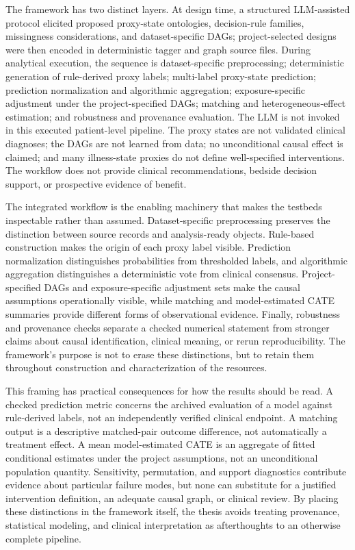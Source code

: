 The framework has two distinct layers.  At design time, a structured LLM-assisted protocol elicited proposed proxy-state ontologies, decision-rule families, missingness considerations, and dataset-specific DAGs; project-selected designs were then encoded in deterministic tagger and graph source files.  During analytical execution, the sequence is dataset-specific preprocessing; deterministic generation of rule-derived proxy labels; multi-label proxy-state prediction; prediction normalization and algorithmic aggregation; exposure-specific adjustment under the project-specified DAGs; matching and heterogeneous-effect estimation; and robustness and provenance evaluation.  The LLM is not invoked in this executed patient-level pipeline.  The proxy states are not validated clinical diagnoses; the DAGs are not learned from data; no unconditional causal effect is claimed; and many illness-state proxies do not define well-specified interventions.  The workflow does not provide clinical recommendations, bedside decision support, or prospective evidence of benefit.

The integrated workflow is the enabling machinery that makes the testbeds inspectable rather than assumed.  Dataset-specific preprocessing preserves the distinction between source records and analysis-ready objects.  Rule-based construction makes the origin of each proxy label visible.  Prediction normalization distinguishes probabilities from thresholded labels, and algorithmic aggregation distinguishes a deterministic vote from clinical consensus.  Project-specified DAGs and exposure-specific adjustment sets make the causal assumptions operationally visible, while matching and model-estimated CATE summaries provide different forms of observational evidence.  Finally, robustness and provenance checks separate a checked numerical statement from stronger claims about causal identification, clinical meaning, or rerun reproducibility.  The framework's purpose is not to erase these distinctions, but to retain them throughout construction and characterization of the resources.

This framing has practical consequences for how the results should be read.  A checked prediction metric concerns the archived evaluation of a model against rule-derived labels, not an independently verified clinical endpoint.  A matching output is a descriptive matched-pair outcome difference, not automatically a treatment effect.  A mean model-estimated CATE is an aggregate of fitted conditional estimates under the project assumptions, not an unconditional population quantity.  Sensitivity, permutation, and support diagnostics contribute evidence about particular failure modes, but none can substitute for a justified intervention definition, an adequate causal graph, or clinical review.  By placing these distinctions in the framework itself, the thesis avoids treating provenance, statistical modeling, and clinical interpretation as afterthoughts to an otherwise complete pipeline.

